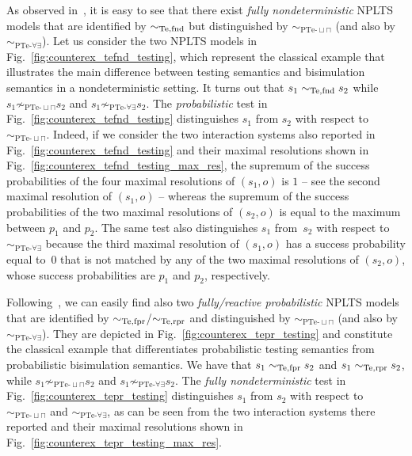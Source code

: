 \documentclass{LMCS}
\newcommand{\sbis}[1]
	{\sim_{#1}}
\begin{document}
As observed in~\cite{JHY94,DGHMZ07b}, it is easy to see that there exist \emph{fully nondeterministic} NPLTS
models that are identified by $\sbis{\rm Te,fnd}$ but distinguished by $\sbis{\textrm{PTe-}\sqcup\sqcap}$
(and also by $\sbis{\textrm{PTe-}\forall\exists}$). Let us consider the two NPLTS models in
Fig.~\ref{fig:counterex_tefnd_testing}, which represent the classical example that illustrates the main
difference between testing semantics and bisimulation semantics in a nondeterministic setting. It turns out
that $s_{1} \sbis{\rm Te,fnd} s_{2}$ while $s_{1} \not\sbis{\textrm{PTe-}\sqcup\sqcap} s_{2}$ and $s_{1}
\not\sbis{\textrm{PTe-}\forall\exists} s_{2}$. The \emph{probabilistic} test in
Fig.~\ref{fig:counterex_tefnd_testing} distinguishes $s_{1}$ from $s_{2}$ with respect to
$\sbis{\textrm{PTe-}\sqcup\sqcap}$. Indeed, if we consider the two interaction systems also reported in
Fig.~\ref{fig:counterex_tefnd_testing} and their maximal resolutions shown in
Fig.~\ref{fig:counterex_tefnd_testing_max_res}, the supremum of the success probabilities of the four
maximal resolutions of $(s_{1}, o)$ is $1$ -- see the second maximal resolution of $(s_{1}, o)$ -- whereas
the supremum of the success probabilities of the two maximal resolutions of $(s_{2}, o)$ is equal to the
maximum between $p_{1}$ and $p_{2}$. The same test also distinguishes $s_{1}$ from~$s_{2}$ with respect to
$\sbis{\textrm{PTe-}\forall\exists}$ because the third maximal resolution of $(s_{1}, o)$ has a success
probability equal to~$0$ that is not matched by any of the two maximal resolutions of $(s_{2}, o)$, whose
success probabilities are $p_{1}$ and $p_{2}$, respectively.

Following~\cite{JHY94}, we can easily find also two \emph{fully/reactive probabilistic} NPLTS models that
are identified by $\sbis{\rm Te,fpr}$/$\sbis{\rm Te,rpr}$ and distinguished by
$\sbis{\textrm{PTe-}\sqcup\sqcap}$ (and also by $\sbis{\textrm{PTe-}\forall\exists}$). They are depicted in
Fig.~\ref{fig:counterex_tepr_testing} and constitute the classical example that differentiates probabilistic
testing semantics from probabilistic bisimulation semantics. We have that $s_{1} \sbis{\rm Te,fpr} s_{2}$
and $s_{1} \sbis{\rm Te,rpr} s_{2}$, while $s_{1} \not\sbis{\textrm{PTe-}\sqcup\sqcap} s_{2}$ and $s_{1}
\not\sbis{\textrm{PTe-}\forall\exists} s_{2}$. The \emph{fully nondeterministic} test in
Fig.~\ref{fig:counterex_tepr_testing} distinguishes $s_{1}$ from $s_{2}$ with respect to
$\sbis{\textrm{PTe-}\sqcup\sqcap}$ and $\sbis{\textrm{PTe-}\forall\exists}$, as can be seen from the two
interaction systems there reported and their maximal resolutions shown in
Fig.~\ref{fig:counterex_tepr_testing_max_res}.
\end{document}
